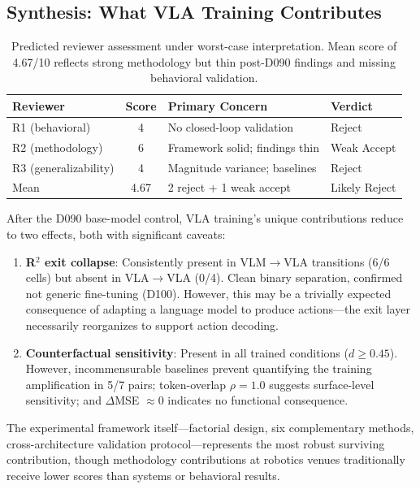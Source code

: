\documentclass[letterpaper]{article}
\begin{document}
\subsection{Synthesis: What VLA Training Contributes}
\label{sec:synthesis}

\begin{table}[h]
\centering
\caption{Predicted reviewer assessment under worst-case interpretation. Mean score of 4.67/10 reflects strong methodology but thin post-D090 findings and missing behavioral validation.}
\label{tab:score_prediction}
\begin{tabular}{lcll}
\toprule
Reviewer & Score & Primary Concern & Verdict \\
\midrule
R1 (behavioral) & 4 & No closed-loop validation & Reject \\
R2 (methodology) & 6 & Framework solid; findings thin & Weak Accept \\
R3 (generalizability) & 4 & Magnitude variance; baselines & Reject \\
\midrule
Mean & 4.67 & 2 reject + 1 weak accept & Likely Reject \\
\bottomrule
\end{tabular}
\end{table}

After the D090 base-model control, VLA training's unique contributions reduce to two effects, both with significant caveats:

\begin{enumerate}[nosep]
    \item \textbf{R$^2$ exit collapse}: Consistently present in VLM$\to$VLA transitions (6/6 cells) but absent in VLA$\to$VLA (0/4). Clean binary separation, confirmed not generic fine-tuning (D100). However, this may be a trivially expected consequence of adapting a language model to produce actions---the exit layer necessarily reorganizes to support action decoding.
    \item \textbf{Counterfactual sensitivity}: Present in all trained conditions ($d \geq 0.45$). However, incommensurable baselines prevent quantifying the training amplification in 5/7 pairs; token-overlap $\rho = 1.0$ suggests surface-level sensitivity; and $\Delta$MSE $\approx 0$ indicates no functional consequence.
\end{enumerate}

The experimental framework itself---factorial design, six complementary methods, cross-architecture validation protocol---represents the most robust surviving contribution, though methodology contributions at robotics venues traditionally receive lower scores than systems or behavioral results.
\end{document}
